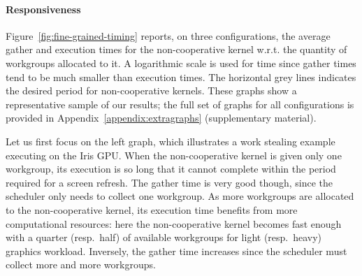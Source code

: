 \documentclass[numbers,nocopyrightspace,10pt]{sigplanconf}
\newcommand{\myfiglong}{Figure~}
\begin{document}

\paragraph{Responsiveness}

\myfiglong\ref{fig:fine-grained-timing} reports, on three
configurations, the average gather and execution times for the non-cooperative
kernel w.r.t. the quantity of workgroups allocated to it.
A logarithmic
scale is used for time since gather times tend to be much smaller than
execution times. The horizontal grey lines indicates the desired period
for non-cooperative kernels.  These graphs show a representative sample of our results; the full set of graphs for all configurations is provided in Appendix~\ref{appendix:extragraphs} (supplementary material).

Let us first focus on the left graph, which illustrates a work stealing
example executing on the Iris GPU.  When the non-cooperative kernel is given only one workgroup, its
execution is so long that it cannot complete within the period required for a screen refresh. The gather time is very good though, since the scheduler
only needs to collect one workgroup. As more workgroups are allocated to
the non-cooperative kernel, its execution time benefits from more computational
resources: here the non-cooperative
kernel becomes fast enough with a quarter (resp.\ half) of available
workgroups for light (resp.\ heavy) graphics workload. Inversely, the
gather time increases since the scheduler must collect more and more
workgroups.
\end{document}
